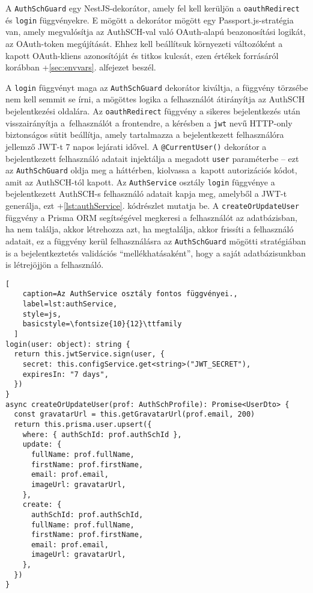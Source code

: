 A \verb|AuthSchGuard| egy NestJS-dekorátor, amely fel kell kerüljön a \verb|oauthRedirect| és \verb|login| függvényekre. E mögött a dekorátor mögött egy Passport.js-stratégia\cite{passport} van, amely megvalósítja az AuthSCH-val való OAuth-alapú beazonosítási logikát, az OAuth-token megújítását. Ehhez kell beállítsuk környezeti változóként a kapott OAuth-kliens azonosítóját és titkos kulcsát, ezen értékek forrásáról korábban \az+\ref{sec:envvars}. alfejezet beszél.

A \verb|login| függvényt maga az \verb|AuthSchGuard| dekorátor kiváltja, a függvény törzsébe nem kell semmit se írni, a mögöttes logika a felhasználót átirányítja az AuthSCH bejelentkezési oldalára. Az \verb|oauthRedirect| függvény a sikeres bejelentkezés után visszairányítja a~felhasználót a frontendre, a kérésben a \verb|jwt| nevű HTTP-only biztonságos sütit beállítja\cite{ietf-oauth-security-topics-13}, amely tartalmazza a bejelentkezett felhasználóra jellemző JWT-t 7 napos lejárati idővel. A \verb|@CurrentUser()| dekorátor a bejelentkezett felhasználó adatait injektálja a megadott \verb|user| paraméterbe -- ezt az \verb|AuthSchGuard| oldja meg a háttérben, kiolvassa a~kapott autorizációs kódot, amit az AuthSCH-tól kapott. Az \verb|AuthService| osztály \verb|login| függvénye a bejelentkezett AuthSCH-s felhasználó adatait kapja meg, amelyből a JWT-t generálja, ezt \az+\ref{lst:authService}. kódrészlet mutatja be. A \verb|createOrUpdateUser| függvény a Prisma ORM segítségével megkeresi a felhasználót az adatbázisban, ha nem találja, akkor létrehozza azt, ha megtalálja, akkor frissíti a felhasználó adatait, ez a függvény kerül felhasználásra az \verb|AuthSchGuard| mögötti stratégiában is a bejelentkeztetés validációs ``mellékhatásaként'', hogy a saját adatbázisunkban is létrejöjjön a felhasználó.

\begin{minipage}{0.92\textwidth}
  \begin{lstlisting}[
    caption=Az AuthService osztály fontos függvényei.,
    label=lst:authService,
    style=js,
    basicstyle=\fontsize{10}{12}\ttfamily
  ]
login(user: object): string {
  return this.jwtService.sign(user, {
    secret: this.configService.get<string>("JWT_SECRET"),
    expiresIn: "7 days",
  })
}
async createOrUpdateUser(prof: AuthSchProfile): Promise<UserDto> {
  const gravatarUrl = this.getGravatarUrl(prof.email, 200)
  return this.prisma.user.upsert({
    where: { authSchId: prof.authSchId },
    update: {
      fullName: prof.fullName,
      firstName: prof.firstName,
      email: prof.email,
      imageUrl: gravatarUrl,
    },
    create: {
      authSchId: prof.authSchId,
      fullName: prof.fullName,
      firstName: prof.firstName,
      email: prof.email,
      imageUrl: gravatarUrl,
    },
  })
}
\end{lstlisting}
\end{minipage}

